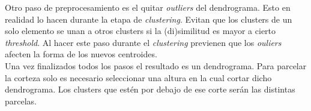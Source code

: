 \vspace{0.1cm}

Otro paso de preprocesamiento es el quitar \textit{outliers} del dendrograma.
Esto en realidad lo hacen durante la etapa de \textit{clustering}. Evitan que los
clusters de un solo elemento se unan a otros clusters si la (di)similitud es 
mayor a cierto \textit{threshold}. Al hacer este paso durante el \textit{clustering}
previenen que los \textit{ouliers} afecten la forma de los nuevos centroides.\\

Una vez finalizados todos los pasos el resultado es un dendrograma. Para parcelar
la corteza solo es necesario seleccionar una altura en la cual cortar dicho
dendrograma. Los clusters que est\'en por debajo de ese corte ser\'an las distintas
parcelas. \\


